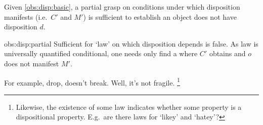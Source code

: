 \begin{note}
  \begin{observation}
    \label{obs:disp:partial}
    Given \autoref{obs:disp:basic}, a partial grasp on conditions under which disposition manifests (i.e.\ \(C'\) and \(M'\)) is sufficient to establish an object does not have disposition \(d\).
  \end{observation}

  \begin{motivation}{obs:disp:partial}
    Sufficient for `law' on which disposition depends is false.
    As law is universally quantified conditional, one needs only find a  where \(C'\) obtains and \(o\) does not manifest \(M'\).
  \end{motivation}

  For example, drop, doesn't break.
  Well, it's not fragile.%
  \footnote{
    Likewise, the existence of some law indicates whether some property is a dispositional property.
    E.g.\ are there laws for `likey' and `hatey'?
  }
\end{note}


